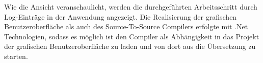 Wie die Ansicht veranschaulicht, werden die durchgeführten Arbeitsschritt durch Log-Einträge in der Anwendung angezeigt.
Die Realisierung der grafischen Benutzeroberfläche als auch des Source-To-Source Compilers erfolgte mit  .Net Technologien,  sodass es möglich ist den Compiler als Abhängigkeit in das Projekt der grafischen Benutzeroberfläche zu laden und von dort aus die Übersetzung zu starten.  


